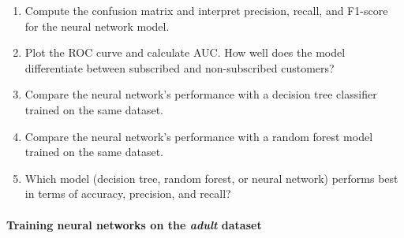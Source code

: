 \documentclass[
  11pt,
]{book}
\providecommand{\tightlist}{%
  \setlength{\itemsep}{0pt}\setlength{\parskip}{0pt}}
\theoremstyle{definition}
\theoremstyle{definition}
\theoremstyle{definition}
\theoremstyle{definition}
\theoremstyle{remark}
\begin{document}
\begin{enumerate}
\def\labelenumi{\arabic{enumi}.}
\setcounter{enumi}{23}
\tightlist
\item
  Compute the confusion matrix and interpret precision, recall, and F1-score for the neural network model.
\item
  Plot the ROC curve and calculate AUC. How well does the model differentiate between subscribed and non-subscribed customers?
\item
  Compare the neural network's performance with a decision tree classifier trained on the same dataset.
\item
  Compare the neural network's performance with a random forest model trained on the same dataset.
\item
  Which model (decision tree, random forest, or neural network) performs best in terms of accuracy, precision, and recall?
\end{enumerate}

\paragraph*{\texorpdfstring{Training neural networks on the \emph{adult} dataset}{Training neural networks on the adult dataset}}\label{training-neural-networks-on-the-adult-dataset}
\end{document}
